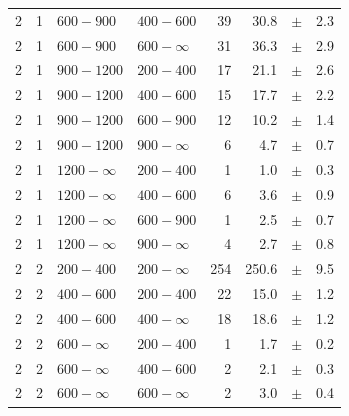 \begin{table}[!h]
\begin{tabular}{rrllrrcl}
2 & 1 & $ 600- 900$ & $400-600$ &     39 &     30.8 &$\pm$&    2.3 \\
2 & 1 & $ 600- 900$ & $600-\infty$ &     31 &     36.3 &$\pm$&    2.9 \\
2\T & 1 & $ 900-1200$ & $200-400$ &     17 &     21.1 &$\pm$&    2.6 \\
2 & 1 & $ 900-1200$ & $400-600$ &     15 &     17.7 &$\pm$&    2.2 \\
2 & 1 & $ 900-1200$ & $600-900$ &     12 &     10.2 &$\pm$&    1.4 \\
2 & 1 & $ 900-1200$ & $900-\infty$ &      6 &      4.7 &$\pm$&    0.7 \\
2\T & 1 & $1200- \infty$ & $200-400$ &      1 &      1.0 &$\pm$&    0.3 \\
2 & 1 & $1200- \infty$ & $400-600$ &      6 &      3.6 &$\pm$&    0.9 \\
2 & 1 & $1200- \infty$ & $600-900$ &      1 &      2.5 &$\pm$&    0.7 \\
2 & 1 & $1200- \infty$ & $900-\infty$ &      4 &      2.7 &$\pm$&    0.8 \\
2\T & 2 & $ 200- 400$ & $200-\infty$ &    254 &    250.6 &$\pm$&    9.5 \\
2\T & 2 & $ 400- 600$ & $200-400$ &     22 &     15.0 &$\pm$&    1.2 \\
2 & 2 & $ 400- 600$ & $400-\infty$ &     18 &     18.6 &$\pm$&    1.2 \\
2\T & 2 & $ 600- \infty$ & $200-400$ &      1 &      1.7 &$\pm$&    0.2 \\
2 & 2 & $ 600- \infty$ & $400-600$ &      2 &      2.1 &$\pm$&    0.3 \\
2 & 2 & $ 600- \infty$ & $600-\infty$ &      2 &      3.0 &$\pm$&    0.4 \\
    \hline
  \end{tabular}
\end{table}

